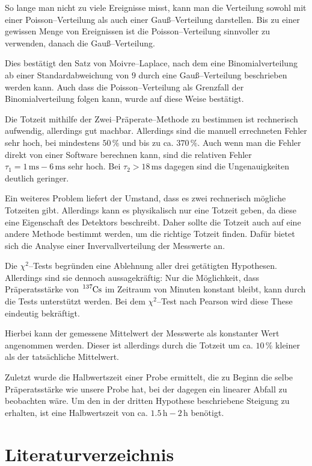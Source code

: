 \documentclass[12pt,a4paper]{scrartcl}
\numberwithin{equation}{section} %
\begin{document}
So lange man nicht zu viele Ereignisse misst, kann man die Verteilung sowohl mit einer Poisson--Verteilung als auch einer Gauß--Verteilung darstellen. Bis zu einer gewissen Menge von Ereignissen ist die Poisson--Verteilung sinnvoller zu verwenden, danach die Gauß--Verteilung.

Dies bestätigt den Satz von Moivre--Laplace, nach dem eine Binomialverteilung ab einer Standardabweichung von $9$ durch eine Gauß--Verteilung beschrieben werden kann. Auch dass die Poisson--Verteilung als Grenzfall der Binomialverteilung folgen kann, wurde auf diese Weise bestätigt.

Die Totzeit mithilfe der Zwei--Präperate--Methode zu bestimmen ist rechnerisch aufwendig, allerdings gut machbar. Allerdings sind die manuell errechneten Fehler sehr hoch, bei mindestens $50\,\%$ und bis zu ca. $370\,\%$. Auch wenn man die Fehler direkt von einer Software berechnen kann, sind die relativen Fehler $\tau_1=1\mathrm{\,ms}-6\mathrm{\,ms}$ sehr hoch. Bei $\tau_2>18\mathrm{\,ms}$ dagegen sind die Ungenauigkeiten deutlich geringer.

Ein weiteres Problem liefert der Umstand, dass es zwei rechnerisch mögliche Totzeiten gibt. Allerdings kann es physikalisch nur eine Totzeit geben, da diese eine Eigenschaft des Detektors beschreibt. Daher sollte die Totzeit auch auf eine andere Methode bestimmt werden, um die richtige Totzeit finden. Dafür bietet sich die Analyse einer Invervallverteilung der Messwerte an.

Die $\chi^2$--Tests begründen eine Ablehnung aller drei getätigten Hypothesen. Allerdings sind sie dennoch aussagekräftig: Nur die Möglichkeit, dass Präperatsstärke von $\ce{^{137}Cs}$ im Zeitraum von Minuten konstant bleibt, kann durch die Tests unterstützt werden. Bei dem $\chi^2$--Test nach Pearson wird diese These eindeutig bekräftigt.

Hierbei kann der gemessene Mittelwert der Messwerte als konstanter Wert angenommen werden. Dieser ist allerdings durch die Totzeit um ca. $10\,\%$ kleiner als der tatsächliche Mittelwert.

Zuletzt wurde die Halbwertszeit einer Probe ermittelt, die zu Beginn die selbe Präperatsstärke wie unsere Probe hat, bei der dagegen ein linearer Abfall zu beobachten wäre. Um den in der dritten Hypothese beschriebene Steigung zu erhalten, ist eine Halbwertszeit von ca. $1.5\mathrm{\,h}-2\mathrm{\,h}$ benötigt.

\clearpage
\hypertarget{literatur}{\section{Literaturverzeichnis}\label{literatur}}
\renewcommand{\section}[2]{}
\end{document}
